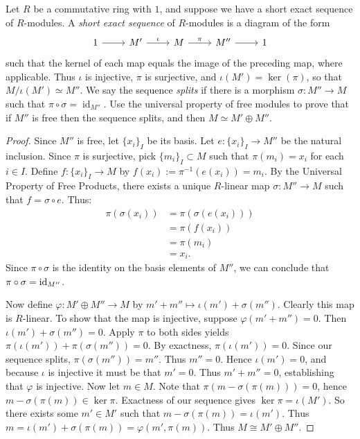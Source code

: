 \documentclass[10pt,oneside,openany]{memoir}
\begin{document}
\newpage
\begin{exercise}
Let $R$ be a commutative ring with $1$, and suppose we have a short exact
sequence of $R$-modules. A \textit{short exact sequence} of $R$-modules is a diagram of the form
\[
\begin{tikzcd}
1 \arrow[r] & M' \arrow[r, "\iota"] & M \arrow[r, "\pi"] & M'' \arrow[r] & 1
\end{tikzcd}
\]
such that the kernel of each map equals the image of the preceding map, where
applicable. Thus $\iota$ is injective, $\pi$ is surjective, and
$\iota(M')=\ker(\pi)$, so that $M/\iota(M')\simeq M''$. We say the sequence
\textit{splits} if there is a morphism $\sigma:M''\longrightarrow M$ such that
$\pi\circ\sigma=\operatorname{id}_{M''}$. Use the universal property of free
modules to prove that if $M''$ is free then the sequence splits, and then
$M\simeq M'\oplus M''$.
\end{exercise}
	{\color{blue}\begin{proof}
		Since $M''$ is free, let $\{x_i\}_I$ be its basis. Let $e: \{x_i\}_I \rightarrow M''$ be the natural inclusion.	Since $\pi$ is surjective, pick $\{m_i\}_I \subset M$ such that $\pi(m_i) = x_i$ for each $i \in I$. Define $f: \{x_i\}_I \rightarrow M$ by $f(x_i) := \pi^{-1}(e(x_i)) = m_i$. By the Universal Property of Free Products, there exists a unique $R$-linear map $\sigma:M'' \rightarrow M$ such that $f = \sigma \circ e$. Thus:
		\begin{align*}
			\pi(\sigma(x_i))
			&= \pi(\sigma(e(x_i))) \\
			&= \pi(f(x_i)) \\
			&= \pi(m_i) \\
			&= x_i.
		\end{align*}
		Since $\pi \circ \sigma$ is the identity on the basis elements of $M''$, we can conclude that $\pi \circ \sigma = \operatorname{id}_{M''}$.

		Now define $\varphi:M' \oplus M'' \rightarrow M$ by $m' + m'' \mapsto \iota(m') + \sigma(m'')$. Clearly this map is $R$-linear. To show that the map is injective, suppose $\varphi(m' + m'') = 0$. Then $\iota(m') + \sigma(m'') = 0$. Apply $\pi$ to both sides yields $\pi(\iota(m')) + \pi(\sigma(m'')) = 0$. By exactness, $\pi(\iota(m')) = 0$. Since our sequence splits, $\pi(\sigma(m'')) = m''$. Thus $m'' = 0$. Hence $\iota(m') = 0$, and because $\iota$ is injective it must be that $m' = 0$. Thus $m' + m'' = 0$, establishing that $\varphi$ is injective. Now let $m \in M$. Note that $\pi(m - \sigma(\pi(m))) = 0$, hence $m - \sigma(\pi(m)) \in \ker\pi$. Exactness of our sequence gives $\ker\pi = \iota(M')$. So there exists some $m' \in M'$ such that $m - \sigma(\pi(m)) = \iota(m')$. Thus $m = \iota(m') + \sigma(\pi(m)) = \varphi(m',\pi(m))$. Thus $M \cong M' \oplus M''$.

	\end{proof}}
\end{document}

